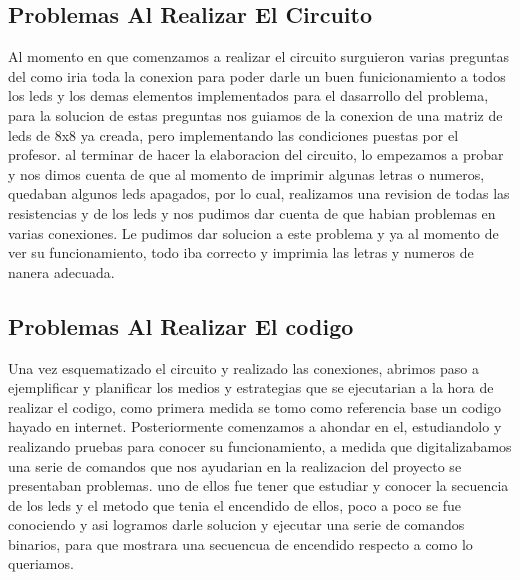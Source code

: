 \documentclass{article}
\begin{document}
\subsection{Problemas Al Realizar El Circuito }
Al momento en que comenzamos a realizar el circuito surguieron varias preguntas del como iria toda la conexion para poder darle un buen funicionamiento a todos los leds y los demas elementos implementados para el dasarrollo del problema, para la solucion de estas preguntas nos guiamos de la conexion de una matriz de leds de 8x8 ya creada, pero implementando las condiciones puestas por el profesor. al terminar de hacer la elaboracion del circuito, lo empezamos a probar y nos dimos cuenta de que al momento de imprimir algunas letras o numeros, quedaban algunos leds apagados, por lo cual, realizamos una revision de todas las resistencias y de los leds y nos pudimos dar cuenta de que habian problemas en varias conexiones. Le pudimos dar solucion a este problema y ya al momento de ver su funcionamiento, todo iba correcto y imprimia las letras y numeros de nanera adecuada. 

\subsection{Problemas Al Realizar El codigo}
Una vez esquematizado el circuito y realizado las conexiones, abrimos paso a ejemplificar y planificar los medios y estrategias que se ejecutarian a la hora de realizar el codigo, como primera medida se tomo como referencia base un codigo hayado en internet. Posteriormente comenzamos a ahondar en el, estudiandolo y realizando pruebas para conocer su funcionamiento, a medida que digitalizabamos una serie de comandos que nos ayudarian en la realizacion del proyecto se presentaban problemas. 
uno de ellos fue tener que estudiar y conocer la secuencia de los leds y el metodo que tenia el encendido de ellos, poco a poco se fue conociendo y asi logramos darle solucion y ejecutar una serie de comandos binarios, para que mostrara una secuencua de encendido respecto a como lo queriamos. 
\end{document}
